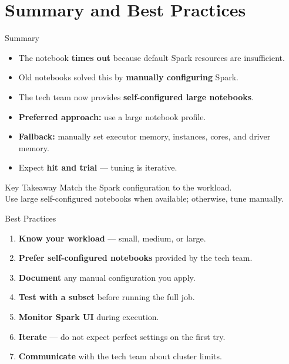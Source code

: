 \documentclass[aspectratio=169]{beamer}
\begin{document}
	\section{Summary and Best Practices}
	
	\begin{frame}{Summary}
		\begin{itemize}
			\item The notebook \textbf{times out} because default Spark resources are insufficient.
			\item Old notebooks solved this by \textbf{manually configuring} Spark.
			\item The tech team now provides \textbf{self-configured large notebooks}.
			\item \textbf{Preferred approach:} use a large notebook profile.
			\item \textbf{Fallback:} manually set executor memory, instances, cores, and driver memory.
			\item Expect \textbf{hit and trial} --- tuning is iterative.
		\end{itemize}
		
		\begin{exampleblock}{Key Takeaway}
			Match the Spark configuration to the workload.\\
			Use large self-configured notebooks when available; otherwise, tune manually.
		\end{exampleblock}
	\end{frame}
	
	\begin{frame}{Best Practices}
		\begin{enumerate}
			\item \textbf{Know your workload} --- small, medium, or large.
			\item \textbf{Prefer self-configured notebooks} provided by the tech team.
			\item \textbf{Document} any manual configuration you apply.
			\item \textbf{Test with a subset} before running the full job.
			\item \textbf{Monitor Spark UI} during execution.
			\item \textbf{Iterate} --- do not expect perfect settings on the first try.
			\item \textbf{Communicate} with the tech team about cluster limits.
		\end{enumerate}
	\end{frame}
	
\end{document}
